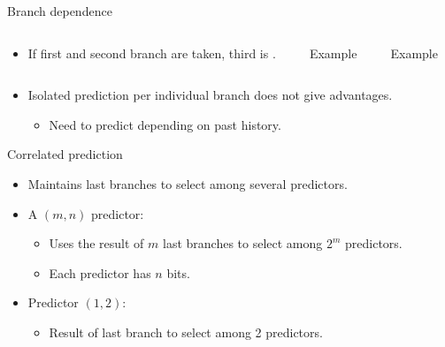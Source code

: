 \begin{frame}[t]{Branch dependence}

\begin{columns}[T]

\begin{column}{.4\textwidth}
\begin{itemize}
  \item If first and second branch are taken, third is .
\end{itemize}
\end{column}

\begin{column}{.3\textwidth}
\begin{block}{Example}

\end{block}
\end{column}

\pause
\begin{column}{.3\textwidth}
\begin{block}{Example}

\end{block}
\end{column}

\end{columns}

\begin{itemize}
  \item Isolated prediction per individual branch does not give advantages.
    \begin{itemize}
      \item Need to predict depending on past history.
    \end{itemize}
\end{itemize}

\end{frame}

\begin{frame}[t]{Correlated prediction}
\begin{itemize}
  \item Maintains last branches  to select among several
        predictors.

  \item A $(m,n)$ predictor:
    \begin{itemize}
      \item Uses the result of $m$ last branches to select among
            $2^m$ predictors.
      \item Each predictor has $n$ bits.
    \end{itemize}

  \item Predictor $(1,2)$:
    \begin{itemize}
      \item Result of last branch to select among 2 predictors.
    \end{itemize}
\end{itemize}
\end{frame}

